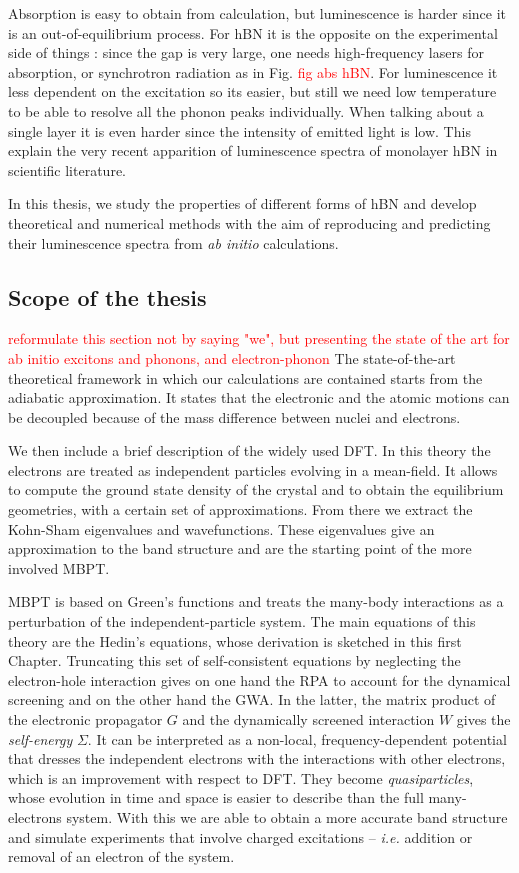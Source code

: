 Absorption is easy to obtain from calculation, but luminescence is harder since it is an out-of-equilibrium process. For hBN it is the opposite on the experimental side of things : since the gap is very large, one needs high-frequency lasers for absorption, or synchrotron radiation as in Fig. \textcolor{red}{fig abs hBN}. For luminescence it less dependent on the excitation so its easier, but still we need low temperature to be able to resolve all the phonon peaks individually. When talking about a single layer it is even harder since the intensity of emitted light is low. This explain the very recent apparition of luminescence spectra of monolayer hBN in scientific literature.

In this thesis, we study the properties of different forms of hBN and develop theoretical and numerical methods with the aim of reproducing and predicting their luminescence spectra from \textit{ab initio} calculations.

\subsection{Scope of the thesis}
%
\textcolor{red}{reformulate this section not by saying "we", but presenting the state of the art for ab initio excitons and phonons, and electron-phonon}
The state-of-the-art theoretical framework in which our calculations are contained starts from the adiabatic approximation. It states that the electronic and the atomic motions can be decoupled because of the mass difference between nuclei and electrons.

We then include a brief description of the widely used \acrfull{DFT}. In this theory the electrons are treated as independent particles evolving in a mean-field. It allows to compute the ground state density of the crystal and to obtain the equilibrium geometries, with a certain set of approximations. From there we extract the Kohn-Sham eigenvalues and wavefunctions. These eigenvalues give an approximation to the band structure and are the starting point of the more involved \acrfull{MBPT}. 

\acrshort{MBPT} is based on Green's functions and treats the many-body interactions as a perturbation of the independent-particle system. The main equations of this theory are the Hedin's equations, whose derivation is sketched in this first Chapter. Truncating this set of self-consistent equations by neglecting the electron-hole interaction gives on one hand the \acrfull{RPA} to account for the dynamical screening and on the other hand the \acrfull{GWA}. In the latter, the matrix product of the electronic propagator $G$ and the dynamically screened interaction $W$ gives the \textit{self-energy} $\Sigma$. It can be interpreted as a non-local, frequency-dependent potential that dresses the independent electrons with the interactions with other electrons, which is an improvement with respect to \acrshort{DFT}. They become \textit{quasiparticles}, whose evolution in time and space is easier to describe than the full many-electrons system.
With this we are able to obtain a more accurate band structure and simulate experiments that involve charged excitations -- \textit{i.e.} addition or removal of an electron of the system. 

